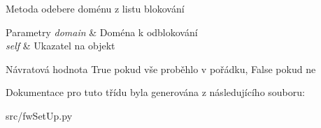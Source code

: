 Metoda odebere doménu z listu blokování 


\begin{DoxyParams}{Parametry}
{\em domain} & Doména k odblokování \\
\hline
{\em self} & Ukazatel na objekt \\
\hline
\end{DoxyParams}
\begin{DoxyReturn}{Návratová hodnota}
True pokud vše proběhlo v pořádku, False pokud ne 
\end{DoxyReturn}


Dokumentace pro tuto třídu byla generována z následujícího souboru\-:\begin{DoxyCompactItemize}
\item 
src/fw\-Set\-Up.\-py\end{DoxyCompactItemize}
